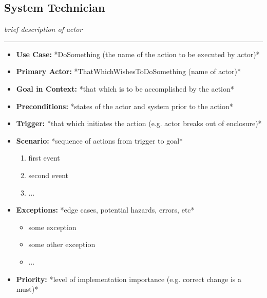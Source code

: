 \documentclass[12pt]{article}
\begin{document}
    \subsection{System Technician}
    \textit{brief description of actor}
    \par\noindent\rule{\textwidth}{0.4pt}    
    \begin{itemize}
        \item[]\textbf{Use Case:}                                
            *DoSomething (the name of the action to be executed by actor)*

        \item[]\textbf{Primary Actor:}
            *ThatWhichWishesToDoSomething (name of actor)*

        \item[]\textbf{Goal in Context:}
            *that which is to be accomplished by the action*

        \item[]\textbf{Preconditions:}
            *states of the actor and system prior to the action*

        \item[]\textbf{Trigger:}
            *that which initiates the action (e.g. actor breaks out of enclosure)*

        \item[]\textbf{Scenario:}
            *sequence of actions from trigger to goal*
            \begin{enumerate}
                \item first event
                \item second event
                \item ...
            \end{enumerate}

        \item[]\textbf{Exceptions:}
            *edge cases, potential hazards, errors, etc*
            \begin{itemize}
                \item[] some exception
                \item[] some other exception                
                \item[] ...
            \end{itemize}

        \item[]\textbf{Priority:}
            *level of implementation importance (e.g. correct change is a must)*


\end{itemize}
\end{document}
